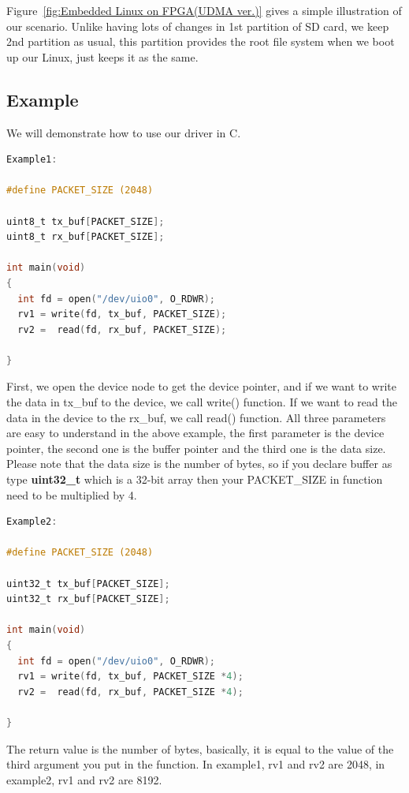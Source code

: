 Figure~\ref{fig:Embedded Linux on FPGA(UDMA ver.)} gives a simple illustration of our scenario. Unlike having lots of changes in 1st partition of SD card, we keep 2nd partition as usual, this partition provides the root file system when we boot up our Linux, just keeps it as the same.
\newpage

\subsection{Example}
\label{subsec:Example}
We will demonstrate how to use our driver in C.

{\renewcommand\baselinestretch{0.8}\selectfont
\begin{lstlisting}[frame=single,language=C]
Example1:

#define PACKET_SIZE (2048)

uint8_t tx_buf[PACKET_SIZE];
uint8_t rx_buf[PACKET_SIZE];

int main(void)
{
  int fd = open("/dev/uio0", O_RDWR);
  rv1 = write(fd, tx_buf, PACKET_SIZE);
  rv2 =  read(fd, rx_buf, PACKET_SIZE);

}
\end{lstlisting}
\par}

First, we open the device node to get the device pointer, and if we want to write the data in tx_buf to the device, we call write() function. If we want to read the data in the device to the rx_buf, we call read() function. All three parameters are easy to understand in the above example, the first parameter is the device pointer, the second one is the buffer pointer and the third one is the data size. Please note that the data size is the number of bytes, so if you declare buffer as type \textbf{uint32_t} which is a 32-bit array then your PACKET_SIZE in function need to be multiplied by 4. 

{\renewcommand\baselinestretch{0.8}\selectfont
\begin{lstlisting}[frame=single,language=C]
Example2:

#define PACKET_SIZE (2048)

uint32_t tx_buf[PACKET_SIZE];
uint32_t rx_buf[PACKET_SIZE];

int main(void)
{
  int fd = open("/dev/uio0", O_RDWR);
  rv1 = write(fd, tx_buf, PACKET_SIZE *4);
  rv2 =  read(fd, rx_buf, PACKET_SIZE *4);

}
\end{lstlisting}
\par}

The return value is the number of bytes, basically, it is equal to the value of the third argument you put in the function.
In example1, rv1 and rv2 are 2048, in example2, rv1 and rv2 are 8192.